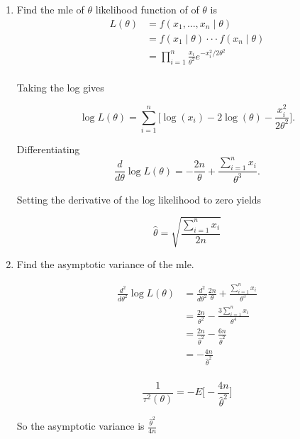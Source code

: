 \documentclass{tufte-book}
\theoremstyle{mytheoremstyle}
\theoremstyle{mylemstyle}
\theoremstyle{mydefstyle}
\begin{document}
\begin{enumerate}
\item Find the mle of $\theta$
 likelihood function of of $\theta$ is
\begin{align*}
L(\theta) &= f(x_1,...,x_n \mid \theta)\\
&= f(x_1 \mid \theta) \cdot \cdot \cdot f(x_n \mid \theta)\\
&= \prod_{i=1}^n \frac{x_i}{\theta^2}e^{-x_i^2/2\theta^2}\\
\end{align*}

Taking the log gives

\[ \log L(\theta) = \sum_{i=1}^n \Big[ \log(x_i) - 2\log(\theta) - \frac{x_i^2}{2\theta^2} \Big]. \]

Differentiating
\[ \frac{d}{d\theta} \log L(\theta) = -\frac{2n}{\theta} + \frac{\sum_{i=1}^n x_i}{\theta^3}. \]

Setting the derivative of the log likelihood to zero yields

\[\hat{\theta} = \sqrt{\frac{\sum_{i=1}^n x_i}{2n}} \]
\item Find the asymptotic variance of the mle. 

\begin{align*}
\frac{d^2}{d\theta^2} \log L(\theta)  &= \frac{d^2}{d\theta^2} \frac{2n}{\theta} + \frac{\sum_{i=1}^n x_i}{\theta^3}\\
&= \frac{2n}{\theta^2} - \frac{3 \sum_{i=1}^n x_i}{\theta^4} \\
&= \frac{2n}{\hat{\theta}^2} - \frac{6n}{\hat{\theta}^2}\\
&= -\frac{4n}{\hat{\theta}^2}\\
\end{align*}

\[ \frac{1}{\tau^2(\theta)} = -E \Big[ -\frac{4n}{\hat{\theta}^2}\Big] \]

So the asymptotic variance is $\frac{\hat{\theta}^2}{4n}$
\end{enumerate}
\end{document}
